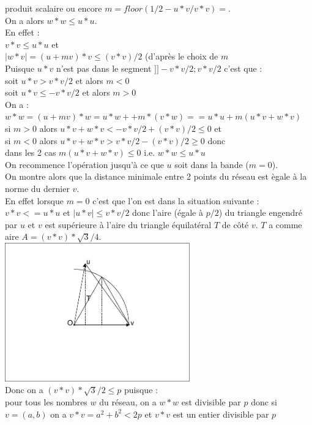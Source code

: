\documentclass[a4paper,11pt]{book}
\begin{document}
\begin{itemize}
produit scalaire ou encore $m=floor(1/2-u*v/v*v)=$.\\
On a alors $w*w\leq u*u$.\\
En effet :\\
$v*v\leq u*u$ et\\
$|w*v|=(u+mv)*v\leq (v*v)/2$ (d'apr\`es le choix de $m$\\
Puisque $u*v$ n'est pas dans le segment $]]-v*v/2;v*v/2$ c'est que :\\
soit $u*v>v*v/2$ et alors $m<0$ \\
soit $u*v\leq -v*v/2$ et alors $m>0$\\
On a :\\
$w*w=(u+mv)*w=u*w++m*(v*w)==u*u+m(u*v+w*v)$\\
si $m>0$ alors  $u*v+w*v< -v*v/2+(v*v)/2\leq 0$ et\\ 
si $m<0$ alors $u*v+w*v>v*v/2-(v*v)/2\geq 0$ donc \\
dans les 2 cas $m(u*v+w*v)\leq 0$ i.e. $w*w\leq u*u$\\
On recommence l'op\'eration jusqu'\`a ce que $u$ soit dans la bande ($m=0$).\\
On montre alors que la distance minimale entre 2 points du r\'eseau est 
\`egale \`a la norme du dernier $v$. \\
En effet lorsque $m=0$ c'est que l'on est dans la situation suivante :\\
$v*v<=u*u$ et $|u*v|\leq v*v/2$ donc l'aire (\'egale \`a $p/2$) du triangle  
engendr\'e par $u$ et $v$ est sup\'erieure \`a l'aire du triangle 
\'equilat\'eral $T$ de c\^ot\'e $v$. $T$ a comme aire
$A=(v*v)*\sqrt 3/4$.\\
\includegraphics[width=8cm]{pa2b2}\\
Donc on a $(v*v)*\sqrt 3/2\leq p$ puisque :\\
pour tous les nombres $w$ du r\'eseau, on a $w*w$ est divisible par $p$ donc
si $v=(a,b)$ on a $v*v=a^2+b^2<2p$ et $v*v$ est un entier divisible par $p$ 

\end{itemize}
\end{document}
